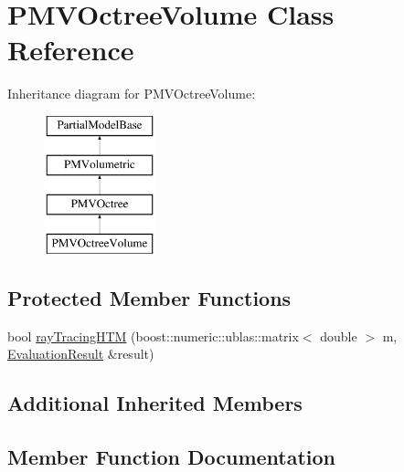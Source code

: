 \hypertarget{classPMVOctreeVolume}{}\section{P\+M\+V\+Octree\+Volume Class Reference}
\label{classPMVOctreeVolume}
Inheritance diagram for P\+M\+V\+Octree\+Volume\+:\begin{figure}[H]
\begin{center}
\leavevmode
\includegraphics[height=4.000000cm]{classPMVOctreeVolume}
\end{center}
\end{figure}
\subsection*{Protected Member Functions}
\begin{DoxyCompactItemize}
\item 
bool \hyperlink{classPMVOctreeVolume_a4c4a6581a0c693feab63de557861390d}{ray\+Tracing\+H\+TM} (boost\+::numeric\+::ublas\+::matrix$<$ double $>$ m, \hyperlink{classEvaluationResult}{Evaluation\+Result} \&result)
\end{DoxyCompactItemize}
\subsection*{Additional Inherited Members}


\subsection{Member Function Documentation}
